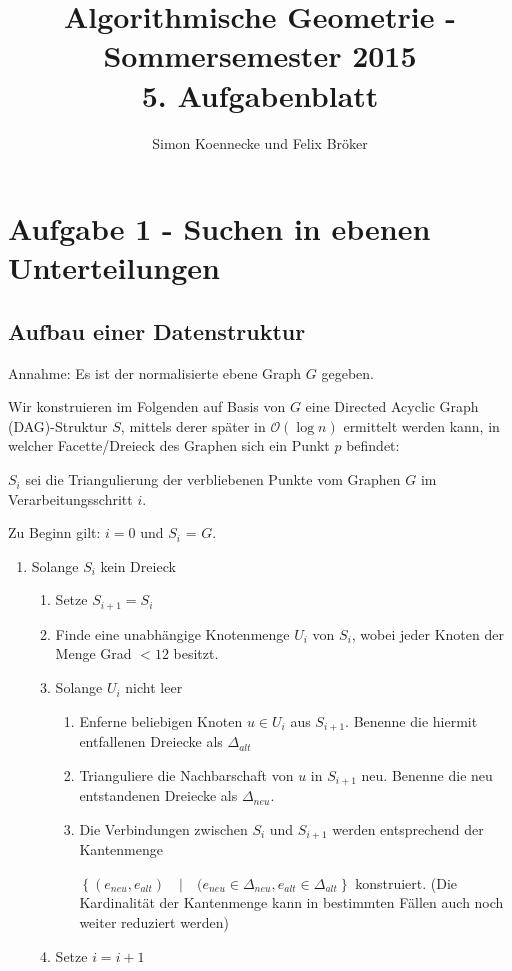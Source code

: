 \documentclass[a4paper]{article}
\begin{document}
\title{Algorithmische Geometrie - Sommersemester 2015\\
       5. Aufgabenblatt }
\author{Simon Koennecke und Felix Bröker}
\date{}
\maketitle

\section*{Aufgabe 1 - Suchen in ebenen Unterteilungen}
\subsection*{Aufbau einer Datenstruktur}
Annahme: Es ist der normalisierte ebene Graph $G$ gegeben. 

Wir konstruieren im Folgenden auf Basis von $G$ eine Directed Acyclic Graph (DAG)-Struktur $S$, mittels derer 
später in $\mathcal{O}(\log n)$ ermittelt werden kann, in welcher Facette/Dreieck des Graphen
sich ein Punkt $p$ befindet:

$S_i$ sei die Triangulierung der verbliebenen Punkte vom Graphen $G$ im Verarbeitungsschritt $i$.

Zu Beginn gilt: $i = 0$ und $S_i$ = $G$.

\begin{enumerate}
 \item Solange $S_i$ kein Dreieck
 \begin{enumerate}
  \item Setze $S_{i+1} = S_i$
  \item Finde eine unabhängige Knotenmenge $U_i$ von $S_i$, wobei jeder Knoten der Menge Grad $< 12$ besitzt.
  \item Solange $U_i$ nicht leer
  \begin{enumerate}
   \item Enferne beliebigen Knoten $u \in U_i$ aus $S_{i+1}$. Benenne die hiermit entfallenen Dreiecke als $\Delta_{alt}$
   \item Trianguliere die Nachbarschaft von $u$ in $S_{i+1}$ neu. Benenne die neu entstandenen Dreiecke als $\Delta_{neu}$.
   \item Die Verbindungen zwischen $S_i$ und $S_{i+1}$ werden entsprechend der Kantenmenge
   
   $\left\{(e_{neu}, e_{alt}) \quad|\quad (e_{neu} \in \Delta_{neu}, e_{alt} \in \Delta_{alt} \right\}$ konstruiert.
   (Die Kardinalität der Kantenmenge kann in bestimmten Fällen auch noch weiter reduziert werden)
  \end{enumerate}
  \item Setze $i = i + 1$
 \end{enumerate}

\end{enumerate}
\end{document}
